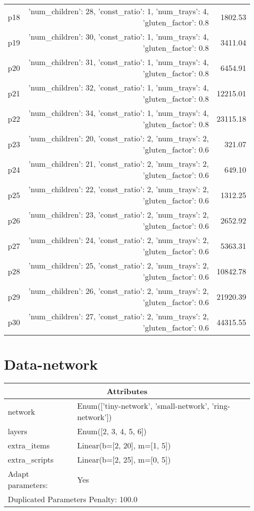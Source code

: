 \documentclass{article}
\begin{document}
\begin{center}
\begin{tabular}{@{}l|r|r@{}}
  p18&{'num\_children': 28, 'const\_ratio': 1, 'num\_trays': 4, 'gluten\_factor': 0.8}&1802.53\\
  p19&{'num\_children': 30, 'const\_ratio': 1, 'num\_trays': 4, 'gluten\_factor': 0.8}&3411.04\\
  p20&{'num\_children': 31, 'const\_ratio': 1, 'num\_trays': 4, 'gluten\_factor': 0.8}&6454.91\\
  p21&{'num\_children': 32, 'const\_ratio': 1, 'num\_trays': 4, 'gluten\_factor': 0.8}&12215.01\\
  p22&{'num\_children': 34, 'const\_ratio': 1, 'num\_trays': 4, 'gluten\_factor': 0.8}&23115.18\\
  p23&{'num\_children': 20, 'const\_ratio': 2, 'num\_trays': 2, 'gluten\_factor': 0.6}&321.07\\
  p24&{'num\_children': 21, 'const\_ratio': 2, 'num\_trays': 2, 'gluten\_factor': 0.6}&649.10\\
  p25&{'num\_children': 22, 'const\_ratio': 2, 'num\_trays': 2, 'gluten\_factor': 0.6}&1312.25\\
  p26&{'num\_children': 23, 'const\_ratio': 2, 'num\_trays': 2, 'gluten\_factor': 0.6}&2652.92\\
  p27&{'num\_children': 24, 'const\_ratio': 2, 'num\_trays': 2, 'gluten\_factor': 0.6}&5363.31\\
  p28&{'num\_children': 25, 'const\_ratio': 2, 'num\_trays': 2, 'gluten\_factor': 0.6}&10842.78\\
  p29&{'num\_children': 26, 'const\_ratio': 2, 'num\_trays': 2, 'gluten\_factor': 0.6}&21920.39\\
  p30&{'num\_children': 27, 'const\_ratio': 2, 'num\_trays': 2, 'gluten\_factor': 0.6}&44315.55
                            \end{tabular}
                            \end{center}
                    
                            \newpage \section{Data-network}
                    \begin{center}
                    \begin{tabular}{@{}p{}p{}@{}}
                    \multicolumn{2}{c}{\bf \large Attributes}\\\midrule
                    network & Enum(['tiny-network', 'small-network', 'ring-network'])\\
layers & Enum([2, 3, 4, 5, 6])\\
extra\_items & Linear(b=[2, 20], m=[1, 5])\\
extra\_scripts & Linear(b=[2, 25], m=[0, 5])
                    \\\midrule
                    Adapt parameters: & Yes \\\midrule
                    \multicolumn{2}{l}{Duplicated Parameters Penalty: 100.0}
                    \end{tabular}
                    \end{center}
                
\end{document}
